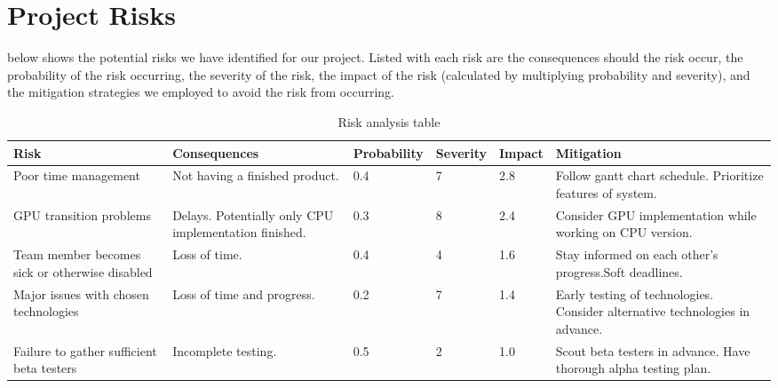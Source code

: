 \chapter{Project Risks}
 below shows the potential risks we have identified for our project. Listed with each risk are the consequences should the risk occur, the probability of the risk occurring, the severity of the risk, the impact of the risk (calculated by multiplying probability and severity), and the mitigation strategies we employed to avoid the risk from occurring.
\newline
\begin{table}[!h]
\def\arraystretch{1.5}
\begin{tabulary}{\textwidth}{|L{2.3cm}|L{2.5cm}|L{2cm}|L{1.5cm}|L{1.3cm}|L{2.9cm}|}
\hline
\textbf{Risk} & \textbf{Consequences} & \textbf{Probability} & \textbf{Severity} & \textbf{Impact} & \textbf{Mitigation} \\
\hline\hline
Poor time management & Not having a finished product. & 0.4 & 7 & 2.8 & Follow gantt chart schedule. Prioritize features of system. \\ \hline
GPU transition problems & Delays. Potentially only CPU implementation finished. & 0.3 & 8 & 2.4 & Consider GPU implementation while working on CPU version. \\ \hline
Team member becomes sick or otherwise disabled & Loss of time. & 0.4 & 4 & 1.6 & Stay informed on each other's progress.Soft deadlines. \\ \hline
Major issues with chosen technologies & Loss of time and progress. & 0.2 & 7 & 1.4 & Early testing of technologies. Consider alternative technologies in advance. \\ \hline
Failure to gather sufficient beta testers & Incomplete testing. & 0.5 & 2 & 1.0 & Scout beta testers in advance. Have thorough alpha testing plan. \\ \hline
\end{tabulary}
\caption{Risk analysis table}
\label{table:risks}
\end{table}